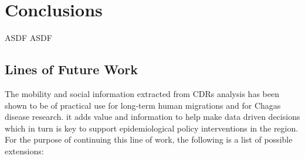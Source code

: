 %
%



\section{Conclusions}\label{section:conclusions}

ASDF ASDF

\subsection{ Lines of Future Work }

The mobility and social information extracted from CDRs analysis has been shown to be of practical use for long-term human migrations and for Chagas disease research.
it adds value and information to help make data driven decisions which in turn is key to support epidemiological policy interventions in the region.
For the purpose of continuing this line of work, the following is a list of possible extensions:


